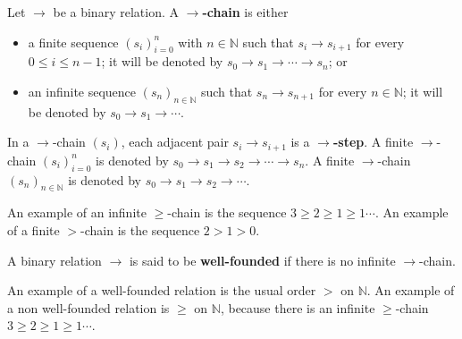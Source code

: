 \begin{definition}
    \label{def:binary_relation:chain} 
    Let \(\to\) be a binary relation. 
    A \textbf{\(\to\)-chain} is either
      \begin{itemize}
          \item a finite sequence \((s_i)_{i=0}^n\) with \(n \mathop{\in} \mathbb{N}\) such that \(s_i \mathop{\to} s_{i+1}\) for every \(0 \leq i \leq n-1\); it will be denoted by \(s_0 \mathop{\to} s_1 \mathop{\to} \cdots \mathop{\to} s_n\); or
          \item an infinite sequence \((s_n)_{n \mathop{\in} \mathbb{N}}\) such that \(s_n \mathop{\to} s_{n+1}\) for every \(n \mathop{\in} \mathbb{N}\); it will be denoted by \(s_0 \mathop{\to} s_1 \mathop{\to} \cdots\).
      \end{itemize}
      In a \(\to\)-chain \((s_i)\), each adjacent pair \(s_i \mathop{\to} s_{i+1}\) is a \textbf{\(\to\)-step}.
      A finite \(\to\)-chain \((s_i)_{i=0}^n\) is denoted by \(s_0 \mathop{\to} s_1 \mathop{\to} s_2 \mathop{\to} \cdots \mathop{\to} s_n \). 
      A finite \(\to\)-chain \((s_n)_{n \mathop{\in} \mathbb{N}}\) is denoted by \(s_0 \mathop{\to} s_1 \mathop{\to} s_2 \mathop{\to} \cdots \).

\end{definition}
An example of an infinite \(\geq\)-chain is the sequence \(3 \mathop{\geq} 2 \mathop{\geq} 1 \mathop{\geq} 1 \cdots\). An example of a finite \(>\)-chain is the sequence \(2 \mathop{>} 1 \mathop{>} 0\).
\begin{definition} 
    \label{def:binary_relation:well_founded}
    A binary relation $\to$ is said to be \textbf{well-founded} if there is no infinite $\to$-chain. 
\end{definition}
An example of a well-founded relation is the usual order
\(>\) on \(\mathbb{N}\). An example of a non well-founded relation is \(\geq\) on \(\mathbb{N}\), because there is an infinite \(\geq\)-chain \(3 \mathop{\geq} 2 \mathop{\geq} 1 \mathop{\geq} 1 \cdots\).